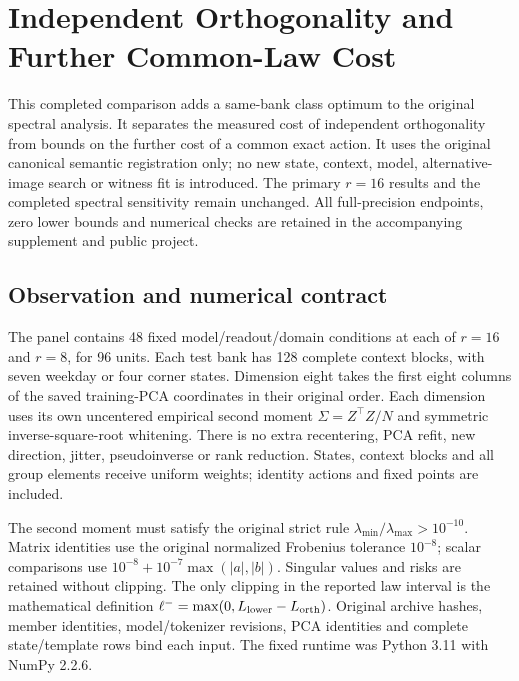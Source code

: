 \section{Independent Orthogonality and Further Common-Law Cost}
\label{app:orthogonal-results}
This completed comparison adds a same-bank class optimum to the original spectral analysis. It separates the measured cost of independent orthogonality from bounds on the further cost of a common exact action. It uses the original canonical semantic registration only; no new state, context, model, alternative-image search or witness fit is introduced. The primary $r=16$ results and the completed spectral sensitivity remain unchanged. All full-precision endpoints, zero lower bounds and numerical checks are retained in the accompanying supplement and public project.

\subsection{Observation and numerical contract}
The panel contains 48 fixed model/readout/domain conditions at each of $r=16$ and $r=8$, for 96 units. Each test bank has 128 complete context blocks, with seven weekday or four corner states. Dimension eight takes the first eight columns of the saved training-PCA coordinates in their original order. Each dimension uses its own uncentered empirical second moment $\Sigma=Z^\top Z/N$ and symmetric inverse-square-root whitening. There is no extra recentering, PCA refit, new direction, jitter, pseudoinverse or rank reduction. States, context blocks and all group elements receive uniform weights; identity actions and fixed points are included.

The second moment must satisfy the original strict rule $\lambda_{\min}/\lambda_{\max}>10^{-10}$. Matrix identities use the original normalized Frobenius tolerance $10^{-8}$; scalar comparisons use $10^{-8}+10^{-7}\max(|a|,|b|)$. Singular values and risks are retained without clipping. The only clipping in the reported law interval is the mathematical definition $\ell^-=\max(0,L_{\rm lower}-L_{\rm orth})$. Original archive hashes, member identities, model/tokenizer revisions, PCA identities and complete state/template rows bind each input. The fixed runtime was Python 3.11 with NumPy 2.2.6.

